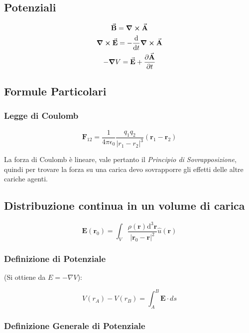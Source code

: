 \documentclass[a4paper]{scrarticle}
\begin{document}
\subsection{Potenziali}

\begin{gather}
    \va B = \curl{\va A} \\
    \curl{\va E} = -\dv{t}\curl{\va A}\\
    -\grad{V} = \va E + \pdv{\va A}{t}
\end{gather}

\subsection{Formule Particolari}

\subsubsection*{Legge di Coulomb}

\begin{equation}
    \bm F_{12} = \frac{1}{4\pi\epsilon_0}\frac{q_1 q_2}{|r_1 - r_2|^3}(\bm r_1 - \bm r_2)
\end{equation}

La forza di Coulomb è lineare, vale pertanto il \emph{Principio di Sovrapposizione}, quindi per trovare la forza su una carica devo sovrapporre gli effetti delle altre cariche agenti.

\subsection*{Distribuzione continua in un volume di carica}

\begin{equation}
    \bm E(\bm r_0 ) = \int_{V} \frac{\rho(\bm r) \text{d}^3 \bm r}{|\bm r_0 - \bm r|^2} \hat{u}(\bm r)
\end{equation}

\subsubsection*{Definizione di Potenziale}
(Si ottiene da $E = -\nabla V$):

\begin{equation}
    V(r_A) - V(r_B) = \int_A^B \bm E \cdot ds
\end{equation}

\subsubsection*{Definizione Generale di Potenziale}
\end{document}
